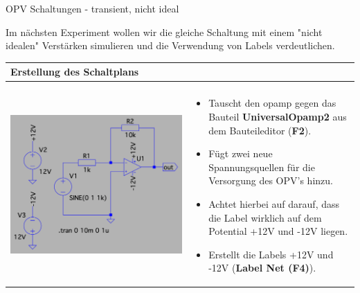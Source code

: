        \begin{frame}[t]{OPV Schaltungen - transient, nicht ideal}

        \begin{spacing}{0.6} \begin{tiny}
        Im nächsten Experiment wollen wir die gleiche Schaltung mit einem "nicht idealen" Verstärken simulieren und die Verwendung
        von Labels verdeutlichen. 
        \end{tiny} \end{spacing}
  
        \begin{spacing}{0.9} \begin{tiny}
        \begin{table}[h!]
          \begin{tabular}{p{3cm} p{7cm}}
            \hline
            \textbf{Erstellung des Schaltplans} & \\
            \hline \\
            \begin{minipage}{.3\textwidth}
              \includegraphics[width=0.8\linewidth]{pictures/opamp_2.png}
            \end{minipage} 
            & 
            \begin{minipage}{.7\textwidth}
            \begin{itemize}
              \item Tauscht den opamp gegen das Bauteil \textbf{UniversalOpamp2} aus dem Bauteileditor (\textbf{F2}).
              \item Fügt zwei neue Spannungsquellen für die Versorgung des OPV's hinzu. 
              \item Achtet hierbei auf darauf, dass die Label wirklich auf dem Potential +12V und -12V liegen.
              \item Erstellt die Labels +12V und -12V (\textbf{Label Net (F4)}).
            \end{itemize}
            \end{minipage} 
            \\
          \end{tabular}


\end{table}
\end{tiny}
\end{spacing}
\end{frame}

